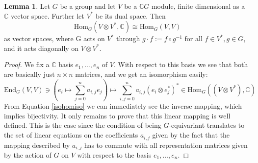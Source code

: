 \documentclass[12pt,a4paper,BCOR15mm,twoside,DIV12]{article}
\def\C{\mathbb{C}}
\def\End{\text{End}}
\def\Hom{\text{Hom}}
\def\fa{\text{ for all }}
\theoremstyle{definition}
\newtheorem{lem}[Satz]{Lemma}
\begin{document}
\begin{lem}\label{homiso}
Let $G$ be a group and let $V$ be a $\C G$ module, finite dimensional as a $\C$ vector space. Further let $V^*$ be its dual space. Then \begin{equation} \Hom_{G}(V \otimes V^*, \C) \cong \Hom_{G}(V,V) \end{equation} as vector spaces, where G acts on $V^*$ through $g \cdot f := f \circ g^{-1}$ for all $f \in V^*, g \in G$, and it acts diagonally on $V \otimes V^*$.
\begin{proof}
We fix a $\C$ basis $e_1, \ldots, e_n$ of $V$. With respect to this basis we see that both are basically just $n \times n$ matrices, and we get an isomorphism easily: 
\begin{equation}\label{isohomiso} \End_G(V,V) \ni (e_i \mapsto \sum_{j=0}^n a_{i,j}e_j) \mapsto \sum_{i,j=0}^n a_{i,j} (e_i \otimes e^*_j)^* \in \Hom_G((V \otimes V^*),\C) \end{equation}
From Equation \ref{isohomiso} we can immediately see the inverse mapping, which implies bijectivity. It only remains to prove that this linear mapping is well defined. This is the case since the condition of being $G$-equivariant translates to the set of linear equations on the coefficients $a_{i,j}$ given by the fact that the mapping described by $a_{i,j}$ has to commute with all
representation matrices given by the action of $G$ on $V$ with respect to the basis $e_1, \ldots, e_n$. 
\end{proof}
\end{lem}
\end{document}
